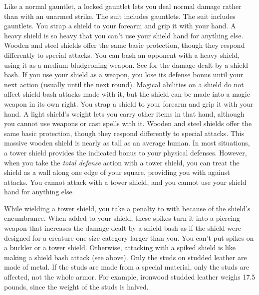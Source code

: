         Like a normal gauntlet, a locked gauntlet lets you deal normal damage rather than  with an unarmed strike.
         The suit includes gauntlets.
         The suit includes gauntlets.
         You strap a shield to your forearm and grip it with your hand. A heavy shield is so heavy that you can't use your shield hand for anything else.
         Wooden and steel shields offer the same basic protection, though they respond differently to special attacks.
         You can bash an opponent with a heavy shield, using it as a medium bludgeoning weapon. See  for the damage dealt by a shield bash.  If you use your shield as a weapon, you lose its defense bonus until your next action (usually until the next round). Magical abilities on a shield do not affect shield bash attacks made with it, but the shield can be made into a magic weapon in its own right.
         You strap a shield to your forearm and grip it with your hand. A light shield's weight lets you carry other items in that hand, although you cannot use weapons or cast spells with it.
         Wooden and steel shields offer the same basic protection, though they respond differently to special attacks.
         This massive wooden shield is nearly as tall as an average human.
        In most situations, a tower shield provides the indicated bonus to your physical defenses.
        However, when you take the \textit{total defense} action with a tower shield, you can treat the shield as a wall along one edge of your square, providing you with  against attacks.
        You cannot attack with a tower shield, and you cannot use your shield hand for anything else.

        While wielding a tower shield, you take a  penalty to  with  because of the shield's encumbrance.
         When added to your shield, these spikes turn it into a piercing weapon that increases the damage dealt by a shield bash as if the shield were designed for a creature one size category larger than you. You can't put spikes on a buckler or a tower shield. Otherwise, attacking with a spiked shield is like making a shield bash attack (see above).
         Only the studs on studded leather are made of metal. If the studs are made from a special material, only the studs are affected, not the whole armor. For example, ironwood studded leather weighs 17.5 pounds, since the weight of the studs is halved.

